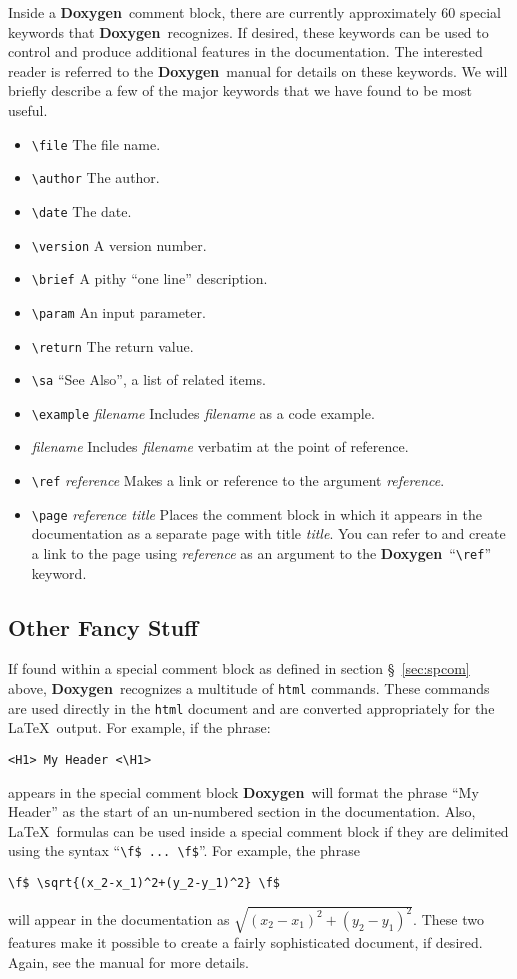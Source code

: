 \documentclass[11pt]{ResearchNote}
\newcommand{\doxy}{{\normalfont\bfseries Doxygen}}
\begin{document}
Inside a \doxy\ comment block, there are currently approximately 60
special keywords that \doxy\ recognizes. If desired, these keywords
can be used to control and produce additional features in the
documentation.  The interested reader is referred to the \doxy\ manual
for details on these keywords.  We will briefly describe a few of the major
keywords that we have found to be most useful.
\begin{itemize}
\item \verb+\file+ The file name.
\item \verb+\author+ The author.
\item \verb+\date+ The date.
\item \verb+\version+ A version number.
\item \verb+\brief+ A pithy ``one line'' description.
\item \verb+\param+ An input parameter.
\item \verb+\return+ The return value.
\item \verb+\sa+ ``See Also'', a list of related items.
\item \verb+\example+ {\em filename} Includes {\em filename} as a code
  example.
\item \verb++ {\em filename} Includes {\em filename} verbatim at the
  point of reference.
\item \verb+\ref+ {\em reference} Makes a link or reference 
  to the argument {\em reference}.
\item \verb+\page+ {\em reference title} Places the comment block in which
  it appears in the documentation as a separate page with title {\em
    title}. You can refer to and create a link to the page using {\em
    reference} as an argument to the \doxy\ ``\verb+\ref+'' keyword.
\end{itemize}

\subsection{Other Fancy Stuff}

If found within a special comment block 
as defined in section \S~\ref{sec:spcom} above, \doxy\ 
recognizes a multitude of \texttt{html} commands. These
commands are used directly in the \texttt{html} document and are converted 
appropriately for the \LaTeX\ output. 
For example, if the phrase: 
\begin{verbatim}
<H1> My Header <\H1>
\end{verbatim} appears in the special comment
block \doxy\ will format the phrase ``My Header'' as the start of an
un-numbered section in the documentation. 
Also, \LaTeX\ formulas can be used inside a special
comment block if they are delimited using the syntax ``\verb+\f$ ... \f$+''.
For example, the phrase 
\begin{verbatim}
\f$ \sqrt{(x_2-x_1)^2+(y_2-y_1)^2} \f$ 
\end{verbatim}  will appear in the
documentation as $\sqrt{(x_2-x_1)^2+(y_2-y_1)^2}$.
These two
features make it possible to create a fairly sophisticated document, if desired.
Again, see the manual for more details.
\end{document}
